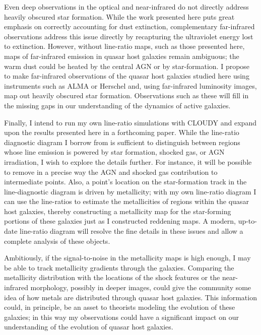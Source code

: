 Even deep observations in the optical and near-infrared do not directly address heavily obscured star formation.  While the work presented here puts great emphasis on correctly accounting for dust extinction, complementary far-infrared observations address this issue directly by recapturing the ultraviolet energy lost to extinction. However, without line-ratio maps, such as those presented here, maps of far-infrared emission in quasar host galaxies remain ambiguous; the warm dust could be heated by the central AGN or by star-formation.  I propose to make far-infrared observations of the quasar host galaxies studied here using instruments such as ALMA or Herschel and, using far-infrared luminosity images, map out heavily obscured star formation.  Observations such as these will fill in the missing gaps in our understanding of the dynamics of active galaxies.

Finally, I intend to run my own line-ratio simulations with CLOUDY and expand upon the results presented here in a forthcoming paper.  While the line-ratio diagnostic diagram I borrow from \cite{BPT} is sufficient to distinguish between regions whose line emission is powered by star formation, shocked gas, or AGN irradiation, I wish to explore the details further. For instance, it will be possible to remove in a precise way the AGN and shocked gas contribution to intermediate points. Also, a point's location on the star-formation track in the line-diagnostic diagram is driven by metallicity; with my own line-ratio diagram I can use the line-ratios to estimate the metallicities of regions within the quasar host galaxies, thereby constructing a metallicity map for the star-forming portions of these galaxies just as I constructed reddening maps. A modern, up-to-date line-ratio diagram will resolve the fine details in these issues and allow a complete analysis of these objects.

Ambitiously, if the signal-to-noise in the metallicity maps is high enough, I may be able to track metallicity gradients through the galaxies.  Comparing the metallicity distribution with the locations of the shock features or the near-infrared morphology, possibly in deeper images, could give the community some idea of how metals are distributed through quasar host galaxies.  This information could, in principle, be an asset to theorists modeling the evolution of these galaxies; in this way my observations could have a significant impact on our understanding of the evolution of quasar host galaxies.



